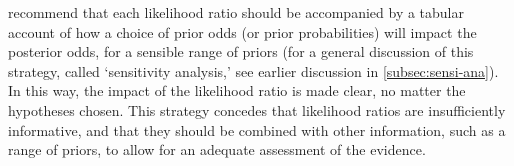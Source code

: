 \documentclass{article}
\begin{document}

\cite{meester2004WhyEffectPriora} recommend that each likelihood ratio should be accompanied by a tabular account of how a choice of prior odds (or prior probabilities) will impact the posterior odds, for a sensible range of priors (for a general discussion of this strategy, called `sensitivity analysis,' see earlier discussion in \ref{subsec:sensi-ana}). In this way, the impact of the likelihood ratio is made clear, no matter the hypotheses chosen. This strategy concedes that likelihood ratios are insufficiently informative, and that they should be combined with other information, such as a range of priors, to allow for an adequate assessment of the evidence.


%
%



\end{document}
